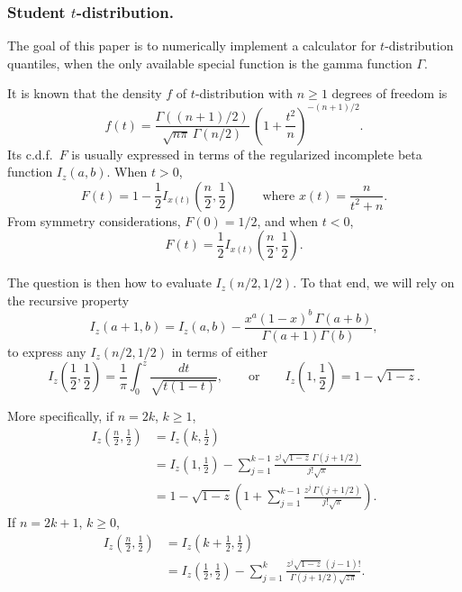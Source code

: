 \documentclass[12pt]{article}
\renewcommand{\geq}{\geqslant}
\begin{document}
\subsubsection*{Student $t$-distribution.}

The goal of this paper is to numerically implement a calculator for $t$-distribution quantiles, when the only available special function is the gamma function $\Gamma $.

It is known that the density $f$ of $t$-distribution with $n \geq 1$ degrees of freedom is
\[
    f(t) = \frac{\Gamma \left((n + 1) / 2\right)}{\sqrt{n \pi } \, \Gamma (n / 2)} \, \left(1 + \frac{t^2}{n}\right)^{-(n + 1) / 2}.
\]
Its c.d.f.\ $F$ is usually expressed in terms of the regularized incomplete beta function $I_{z}(a, b)$. When $t > 0$,
\[
    F(t) = 1 - \frac{1}{2} I_{x(t)}\left(\frac{n}{2}, \frac{1}{2}\right) \qquad \text{where $x(t) = \displaystyle\frac{n}{t^2 + n}$}.
\]
From symmetry considerations, $F(0) = 1/2$, and when $t < 0$,
\[
    F(t) = \frac{1}{2} I_{x(t)} \left(\frac{n}{2}, \frac{1}{2}\right).
\]

The question is then how to evaluate $I_{z}(n / 2, 1 / 2)$. To that end, we will rely on the recursive property
\[
    I_z(a + 1, b) = I_z(a, b) - \frac{x^a (1 - x)^b \, \Gamma (a + b)}{\Gamma (a + 1) \Gamma (b)},
\]
to express any $I_{z}(n / 2, 1 / 2)$ in terms of either
\[
    I_z \left(\frac{1}{2}, \frac{1}{2}\right) = \frac{1}{\pi } \int _0 ^z \frac{dt}{\sqrt{t (1 - t)}}, \qquad \text{or} \qquad
    I_z \left(1, \frac{1}{2}\right) = 1 - \sqrt{1 - z}.
\]

More specifically, if $n = 2 k$, $k \geq 1$,
\begin{align*}
    I_z \left(\frac{n}{2}, \frac{1}{2}\right) &= I_z \left(k, \frac{1}{2}\right) \\
        &= I_z \left(1, \frac{1}{2}\right) - \sum _{j = 1} ^{k - 1} \frac{z^j \sqrt{1 - z} \, \Gamma (j + 1/2)}{j! \sqrt{\pi }} \\
        &= 1 - \sqrt{1 - z} \left( 1 + \sum _{j = 1} ^{k - 1} \frac{z^j \, \Gamma (j + 1/2)}{j! \sqrt{\pi }} \right).
\end{align*}
If $n = 2 k + 1$, $k \geq 0$,
\begin{align*}
    I_z \left(\frac{n}{2}, \frac{1}{2}\right) &= I_z \left(k + \frac{1}{2}, \frac{1}{2}\right) \\
        &= I_z \left(\frac{1}{2}, \frac{1}{2}\right) - \sum _{j = 1} ^{k} \frac{z^{j} \sqrt{1 - z} \, (j - 1)!}{\Gamma (j + 1/2) \sqrt{z \pi }}.
\end{align*}
\end{document}
